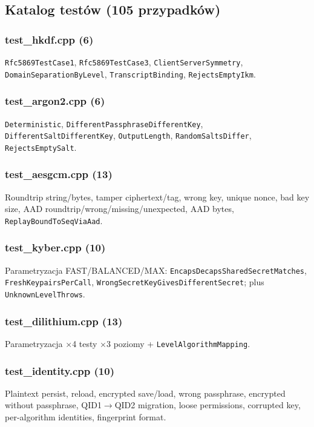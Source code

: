 \documentclass[12pt,a4paper]{article}
\begin{document}
\subsection{Katalog testów (105 przypadków)}

\subsubsection{test\_hkdf.cpp (6)}
\texttt{Rfc5869TestCase1}, \texttt{Rfc5869TestCase3}, \texttt{ClientServerSymmetry}, \texttt{DomainSeparationByLevel}, \texttt{TranscriptBinding}, \texttt{RejectsEmptyIkm}.

\subsubsection{test\_argon2.cpp (6)}
\texttt{Deterministic}, \texttt{DifferentPassphraseDifferentKey}, \texttt{DifferentSaltDifferentKey}, \texttt{OutputLength}, \texttt{RandomSaltsDiffer}, \texttt{RejectsEmptySalt}.

\subsubsection{test\_aesgcm.cpp (13)}
Roundtrip string/bytes, tamper ciphertext/tag, wrong key, unique nonce, bad key size, AAD roundtrip/wrong/missing/unexpected, AAD bytes, \texttt{ReplayBoundToSeqViaAad}.

\subsubsection{test\_kyber.cpp (10)}
Parametryzacja FAST/BALANCED/MAX: \texttt{EncapsDecapsSharedSecretMatches}, \texttt{FreshKeypairsPerCall}, \texttt{WrongSecretKeyGivesDifferentSecret}; plus \texttt{UnknownLevelThrows}.

\subsubsection{test\_dilithium.cpp (13)}
Parametryzacja $\times$4 testy $\times$3 poziomy + \texttt{LevelAlgorithmMapping}.

\subsubsection{test\_identity.cpp (10)}
Plaintext persist, reload, encrypted save/load, wrong passphrase, encrypted without passphrase, QID1$\rightarrow$QID2 migration, loose permissions, corrupted key, per-algorithm identities, fingerprint format.
\end{document}
